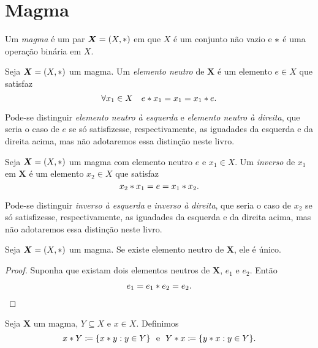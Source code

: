 \section{Magma}

\begin{defi}
	Um \emph{magma} é um par $\bm X=(X, \ast )$ em que $X$ é um conjunto não vazio e $ \ast $ é uma operação binária em $X$.
\end{defi}

\begin{defi}
	Seja $\bm X=(X, \ast )$ um magma. Um \emph{elemento neutro} de $\bm X$ é um elemento $e \in X$ que satisfaz
	\begin{equation*}
	\forall x_1 \in X \quad e \ast x_1 = x_1 = x_1 \ast e.
	\end{equation*}
\end{defi}

Pode-se distinguir \emph{elemento neutro à esquerda} e \emph{elemento neutro à direita}, que seria o caso de $e$ se só satisfizesse, respectivamente, as iguadades da esquerda e da direita acima, mas não adotaremos essa distinção neste livro.

\begin{defi}
	Seja $\bm X = (X, \ast )$ um magma com elemento neutro $e$ e $x_1 \in X$. Um \emph{inverso} de $x_1$ em $\bm X$ é um elemento $x_2 \in X$ que satisfaz
	\begin{equation*}
	x_2 \ast x_1 = e =  x_1 \ast x_2.
	\end{equation*}
\end{defi}

Pode-se distinguir \emph{inverso à esquerda} e \emph{inverso à direita}, que seria o caso de $x_2$ se só satisfizesse, respectivamente, as iguadades da esquerda e da direita acima, mas não adotaremos essa distinção neste livro.

\begin{prop}
\label{prop:unic.elem.neut}
	Seja $\bm X = (X, \ast )$ um magma. Se existe elemento neutro de $\bm X$, ele é único.
\end{prop}
\begin{proof}
	Suponha que existam dois elementos neutros de $\bm X$, $e_1$ e $e_2$. Então
	\begin{align*}
	e_1 = e_1 \ast e_2 = e_2.
	\end{align*}
\end{proof}

\begin{defi}
Seja $\bm X$ um magma, $Y \subseteq X$ e $x \in X$. Definimos
	\begin{equation*}
	x \opb Y \coloneqq \{x \opb y:y \in Y\} \e 	Y \opb x \coloneqq \{y \opb x:y \in Y\}.
	\end{equation*}
\end{defi}

